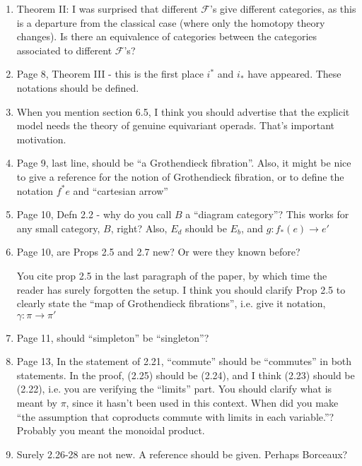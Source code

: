 \documentclass{article}
\begin{document}
\begin{enumerate}
	\item
	Theorem II: I was surprised that different $\mathcal{F}$'s give different categories, as this is a departure from the classical case (where only the homotopy theory changes). Is there an equivalence of categories between the categories associated to different $\mathcal{F}$'s?
	
	
	\item
	Page 8, Theorem III - this is the first place $i^*$ and $i_*$ have appeared. These notations should be defined.
	
	\item
	When you mention section 6.5, I think you should advertise that the explicit model needs the theory of genuine equivariant operads. That's important motivation.
	
	\item
	Page 9, last line, should be ``a Grothendieck fibration''. Also, it might be nice to give a reference for the notion of Grothendieck fibration, or to define the notation $f^*e$ and ``cartesian arrow''
	
	\item
	Page 10, Defn 2.2 - why do you call $B$ a ``diagram category''? This works for any small category, $B$, right? Also, $E_d$ should be $E_b$, and $g: f_*(e) \to e'$
	
	
	\item
	Page 10, are Props 2.5 and 2.7 new? Or were they known before?
	
	You cite prop 2.5 in the last paragraph of the paper, by which time the reader has surely forgotten the setup. I think you should clarify Prop 2.5 to clearly state the ``map of Grothendieck fibrations'', i.e. give it notation, $\gamma \colon \pi \to \pi'$
	
	
	\item
	Page 11, should ``simpleton'' be ``singleton''?
	
	
	\item
	Page 13, In the statement of 2.21, ``commute'' should be ``commutes'' in both statements.
	In the proof, (2.25) should be (2.24), and I think (2.23) should be (2.22), i.e. you are verifying the ``limits'' part. 
	You should clarify what is meant by $\pi$, since it hasn't been used in this context.
	When did you make ``the assumption that coproducts commute with limits in each variable.''? Probably you meant the monoidal product.
	
	\item
	Surely 2.26-28 are not new. A reference should be given. Perhaps Borceaux?
	

\end{enumerate}
\end{document}
